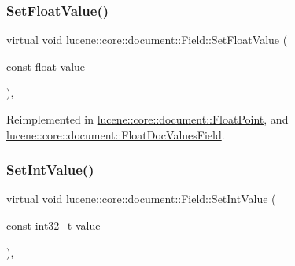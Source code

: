 \mbox{\label{classlucene_1_1core_1_1document_1_1Field_aa22291dffcf6a545fd6c24f23fbb8b50}} 
\subsubsection{\texorpdfstring{Set\+Float\+Value()}{SetFloatValue()}}
{\footnotesize\ttfamily virtual void lucene\+::core\+::document\+::\+Field\+::\+Set\+Float\+Value (\begin{DoxyParamCaption}\item[{\mbox{\hyperlink{ZlibCrc32_8h_a2c212835823e3c54a8ab6d95c652660e}{const}} float}]{value }\end{DoxyParamCaption})\hspace{0.3cm}{\ttfamily [inline]}, {\ttfamily [virtual]}}



Reimplemented in \mbox{\hyperlink{classlucene_1_1core_1_1document_1_1FloatPoint_a4e1f81bce5f905e267a32c4882faf90e}{lucene\+::core\+::document\+::\+Float\+Point}}, and \mbox{\hyperlink{classlucene_1_1core_1_1document_1_1FloatDocValuesField_a929d0812b571be2208f51d420b0dd9ed}{lucene\+::core\+::document\+::\+Float\+Doc\+Values\+Field}}.

\mbox{\label{classlucene_1_1core_1_1document_1_1Field_a6aee080f0bf507f8c6a5cfc64bd913a2}} 
\subsubsection{\texorpdfstring{Set\+Int\+Value()}{SetIntValue()}}
{\footnotesize\ttfamily virtual void lucene\+::core\+::document\+::\+Field\+::\+Set\+Int\+Value (\begin{DoxyParamCaption}\item[{\mbox{\hyperlink{ZlibCrc32_8h_a2c212835823e3c54a8ab6d95c652660e}{const}} int32\+\_\+t}]{value }\end{DoxyParamCaption})\hspace{0.3cm}{\ttfamily [inline]}, {\ttfamily [virtual]}}




